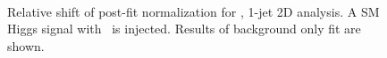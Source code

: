 \begin{figure}[!hbtp]
{}
\\
\caption{Relative shift of post-fit normalization for  \GeV, 1-jet 2D analysis.
A SM Higgs signal with  \GeV\ is injected. Results of background only fit are shown.}
\label{fig:norm_inj125_1j_125_bfit}
\end{figure}

